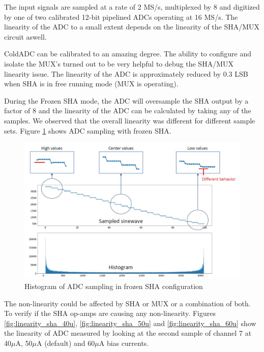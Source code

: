 \label{sec:5.4}


The input signals are sampled at a rate of 2 MS/s, multiplexed by 8 and digitized by one of two calibrated 12-bit pipelined ADCs operating at 16 MS/s. The linearity of the ADC to a small extent depends on the linearity of the SHA/MUX circuit aswell. 

ColdADC can be calibrated to an amazing degree. The ability to configure and isolate the MUX's turned out to be very helpful to debug the SHA/MUX linearity issue. The linearity of the ADC is approximately reduced by 0.3 LSB when SHA is in free running mode (MUX is operating). 


During the Frozen SHA mode, the ADC will oversample the SHA output by a factor of 8 and the linearity of the ADC can be calculated by taking any of the samples. We observed that the overall linearity was different for different sample sets. Figure \ref{fig:sha_sample_hist} shows ADC sampling with frozen SHA.

\begin{figure}[h!]
\centering
  \includegraphics[width=0.7\linewidth]{figures/prakash_fig/sha_sample_hist.JPG}
  \caption{Histogram of ADC sampling in frozen SHA configuration}
  \label{fig:sha_sample_hist}
\end{figure}

The non-linearity could be affected by SHA or MUX or a combination of both. To verify if the SHA op-amps are causing any non-linearity. Figures \ref{fig:linearity_sha_40u}, \ref{fig:linearity_sha_50u} and \ref{fig:linearity_sha_60u} show the linearity of ADC measured by looking at the second sample of channel 7 at 40$\mu$A, 50$\mu$A (default) and 60$\mu$A bias currents. 

